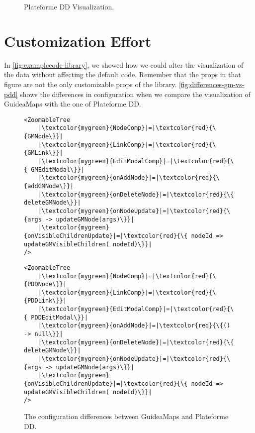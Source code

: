 \begin{figure}[H]
	\centering
	\caption{Plateforme DD Visualization.}
	\label{fig:plateforme-dd}
\end{figure}



\section{Customization Effort}\label{sec:customization-effort}
In \autoref{fig:examplecode-library}, we showed how we could alter the visualization of the data without affecting the default code. Remember that the props in that figure are not the only customizable props of the library. \autoref{fig:differences-gm-vs-pdd} shows the differences in configuration when we compare the visualization of GuideaMaps with the one of Plateforme DD.

\begin{figure}[H]
	\begin{minipage}{0.5\textwidth}
 		 \centering
		 \begin{verbatim}
<ZoomableTree
    |\textcolor{mygreen}{NodeComp}|=|\textcolor{red}{\{GMNode\}}|
    |\textcolor{mygreen}{LinkComp}|=|\textcolor{red}{\{GMLink\}}|
    |\textcolor{mygreen}{EditModalComp}|=|\textcolor{red}{\{ GMEditModal\}}|
    |\textcolor{mygreen}{onAddNode}|=|\textcolor{red}{\{addGMNode\}}|
    |\textcolor{mygreen}{onDeleteNode}|=|\textcolor{red}{\{ deleteGMNode\}}|
    |\textcolor{mygreen}{onNodeUpdate}|=|\textcolor{red}{\{args -> updateGMNode(args)\}}|
    |\textcolor{mygreen}{onVisibleChildrenUpdate}|=|\textcolor{red}{\{ nodeId => updateGMVisibleChildren( nodeId)\}}|
/>
		\end{verbatim}
		\label{lst:default-components}
	\end{minipage}
 	\begin{minipage}{0.5\textwidth}
  		\centering
  		\begin{verbatim}
<ZoomableTree
    |\textcolor{mygreen}{NodeComp}|=|\textcolor{red}{\{PDDNode\}}|
    |\textcolor{mygreen}{LinkComp}|=|\textcolor{red}{\{PDDLink\}}|
    |\textcolor{mygreen}{EditModalComp}|=|\textcolor{red}{\{ PDDEditModal\}}|
    |\textcolor{mygreen}{onAddNode}|=|\textcolor{red}{\{() -> null\}}|
    |\textcolor{mygreen}{onDeleteNode}|=|\textcolor{red}{\{ deleteGMNode\}}|
    |\textcolor{mygreen}{onNodeUpdate}|=|\textcolor{red}{\{args -> updateGMNode(args)\}}|
    |\textcolor{mygreen}{onVisibleChildrenUpdate}|=|\textcolor{red}{\{ nodeId => updateGMVisibleChildren( nodeId)\}}|
/>
		\end{verbatim}
		\label{lst:custom-components}
 	\end{minipage}
	\caption{The configuration differences between GuideaMaps and Plateforme DD.}
	\label{fig:differences-gm-vs-pdd}
\end{figure}

